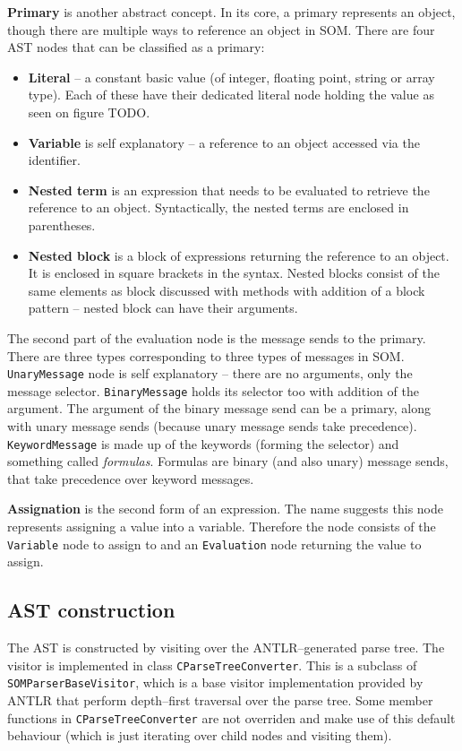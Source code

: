 \documentclass[thesis=M,english]{FITthesis}[2019/12/23]
\begin{document}
\textbf{Primary} is another abstract concept. In its core, a primary represents an object, though there are multiple ways to reference an object in SOM.
There are four AST nodes that can be classified as a primary:
\begin{itemize}
	\item \textbf{Literal} -- a constant basic value (of integer, floating point, string or array type). Each of these have their dedicated literal node
		holding the value as seen on figure TODO.
	\item \textbf{Variable} is self explanatory -- a reference to an object accessed via the identifier.
	\item \textbf{Nested term} is an expression that needs to be evaluated to retrieve the reference to an object. Syntactically, the nested terms
		are enclosed in parentheses.
	\item \textbf{Nested block} is a block of expressions returning the reference to an object. It is enclosed in square brackets in the syntax.
		Nested blocks consist of the same elements as block discussed with methods with addition of a block pattern -- nested block can have their arguments. %
\end{itemize}

The second part of the evaluation node is the message sends to the primary. There are three types corresponding to three types of messages in SOM.
\texttt{UnaryMessage} node is self explanatory -- there are no arguments, only the message selector. \texttt{BinaryMessage} holds its selector too
with addition of the argument. The argument of the binary message send can be a primary, along with unary message sends (because unary message sends take
precedence). \texttt{KeywordMessage} is made up of the keywords (forming the selector) and something called \textit{formulas}. Formulas are binary (and also unary) message
sends, that take precedence over keyword messages.

\textbf{Assignation} is the second form of an expression. The name suggests this node represents assigning a value into a variable. Therefore the node consists
of the \texttt{Variable} node to assign to and an \texttt{Evaluation} node returning the value to assign.

\subsection{AST construction}
The AST is constructed by visiting over the ANTLR--generated parse tree. The visitor is implemented in class \texttt{CParseTreeConverter}. This is a subclass
of \texttt{SOMParserBaseVisitor}, which is a base visitor implementation provided by ANTLR that perform depth--first traversal over the parse tree. Some member
functions in \texttt{CParseTreeConverter} are not overriden and make use of this default behaviour (which is just iterating over child nodes and visiting them).
\end{document}

